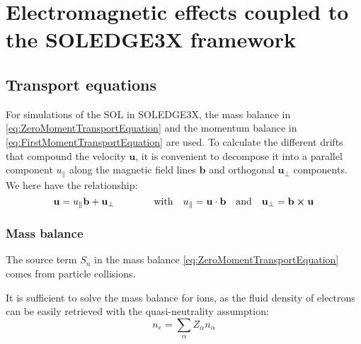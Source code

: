 \chapter{Electromagnetic effects coupled to the SOLEDGE3X framework}
\label{chap:SOLEDGE3X_framework}

\section{Transport equations}
\label{sec:S3X_equations}
For simulations of the SOL in SOLEDGE3X, the mass balance in \ref{eq:ZeroMomentTransportEquation} and the momentum balance in \ref{eq:FirstMomentTransportEquation} are used. To calculate the different drifts that compound the velocity $\mathbf{u}$, it is convenient to decompose it into a parallel component $u_\parallel$ along the magnetic field lines $\mathbf{b}$ and orthogonal $\mathbf{u}_\perp$ components. We here have the relationship:
\begin{equation}
	\label{eq:RelationPerpParallelVelocity}
	\mathbf{u} = u_\parallel \mathbf{b} + \mathbf{u}_\perp \qquad\qquad \text{with} \quad u_\parallel = \mathbf{u}\cdot\mathbf{b} \quad \text{and} \quad \mathbf{u}_\perp = \mathbf{b}\cross\mathbf{u}
\end{equation}

\subsection{Mass balance}
The source term $S_n$ in the mass balance \ref{eq:ZeroMomentTransportEquation} comes from particle collisions. 


It is sufficient to solve the mass balance for ions, as the fluid density of electrons can be easily retrieved with the quasi-neutrality assumption:
\begin{equation}
	n_e = \sum_{\alpha}Z_\alpha n_\alpha
\end{equation}

